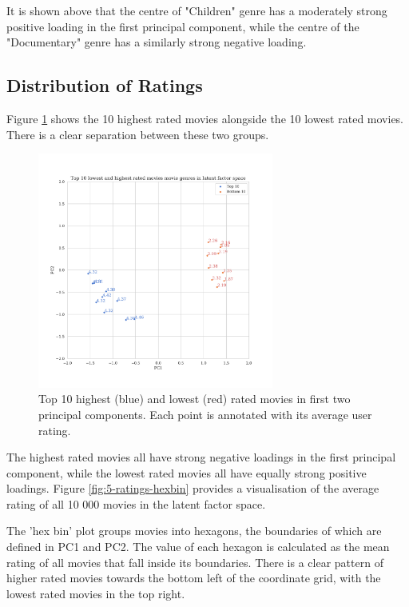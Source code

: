 It is shown above that the centre of "Children" genre has a moderately strong positive loading in the first principal component, while the centre of the "Documentary" genre has a similarly strong negative loading.

\subsection{Distribution of Ratings}
Figure \ref{fig:5-ratings-scatter} shows the 10 highest rated movies alongside the 10 lowest rated movies. There is a clear separation between these two groups.

\begin{figure}[H]
\centering
\includegraphics[width=0.69\textwidth]{Figures/5_ml10m-ratings-scatter.pdf}
\decoRule
\caption[Top 10 highest and lowest rated movies]{Top 10 highest (blue) and lowest (red) rated movies in first two principal components. Each point is annotated with its average user rating.}
\label{fig:5-ratings-scatter}
\end{figure}

The highest rated movies all have strong negative loadings in the first principal component, while the lowest rated movies all have equally strong positive loadings. Figure \ref{fig:5-ratings-hexbin} provides a visualisation of the average rating of all 10 000 movies in the latent factor space.

The 'hex bin' plot groups movies into hexagons, the boundaries of which are defined in PC1 and PC2. The value of each hexagon is calculated as the mean rating of all movies that fall inside its boundaries. There is a clear pattern of higher rated movies towards the bottom left of the coordinate grid, with the lowest rated movies in the top right.

